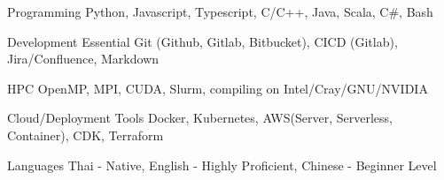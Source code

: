 

\begin{cvskills}

  \cvskill
    {Programming} %
    {Python, Javascript, Typescript, C/C++, Java, Scala, C\#, Bash} %

\cvskill
    {Development Essential} %
    {Git (Github, Gitlab, Bitbucket), CICD (Gitlab), Jira/Confluence, Markdown} %

  \cvskill
    {HPC} %
    {OpenMP, MPI, CUDA, Slurm, compiling on Intel/Cray/GNU/NVIDIA } %

  \cvskill
    {Cloud/Deployment Tools} %
    {Docker, Kubernetes, AWS(Server, Serverless, Container), CDK, Terraform} %

  \cvskill
    {Languages} %
    {Thai - Native, English - Highly Proficient, Chinese - Beginner Level} %

\end{cvskills}

